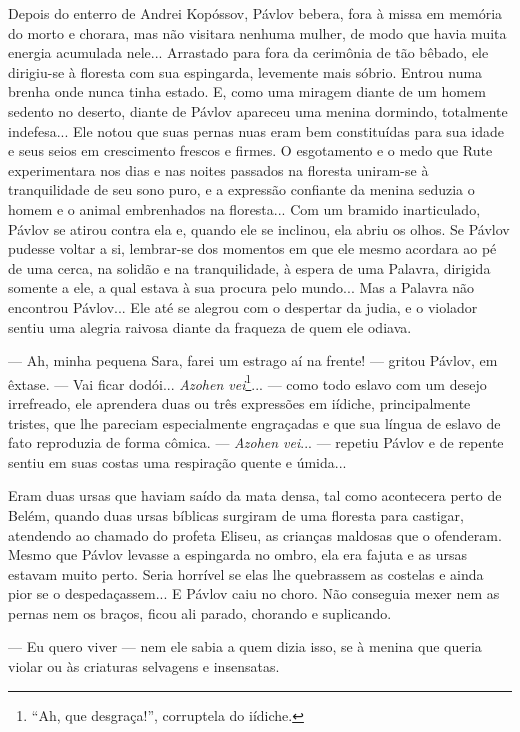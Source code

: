 Depois do enterro de Andrei Kopóssov, Pávlov bebera, fora à missa em
memória do morto e chorara, mas não visitara nenhuma mulher, de modo que
havia muita energia acumulada nele... Arrastado para fora da cerimônia
de tão bêbado, ele dirigiu-se à floresta com sua espingarda, levemente
mais sóbrio. Entrou numa brenha onde nunca tinha estado. E, como uma
miragem diante de um homem sedento no deserto, diante de Pávlov apareceu
uma menina dormindo, totalmente indefesa... Ele notou que suas pernas
nuas eram bem constituídas para sua idade e seus seios em crescimento
frescos e firmes. O esgotamento e o medo que Rute experimentara nos dias
e nas noites passados na floresta uniram-se à tranquilidade de seu sono
puro, e a expressão confiante da menina seduzia o homem e o animal
embrenhados na floresta... Com um bramido inarticulado, Pávlov se atirou
contra ela e, quando ele se inclinou, ela abriu os olhos. Se Pávlov
pudesse voltar a si, lembrar-se dos momentos em que ele mesmo acordara
ao pé de uma cerca, na solidão e na tranquilidade, à espera de uma
Palavra, dirigida somente a ele, a qual estava à sua procura pelo
mundo... Mas a Palavra não encontrou Pávlov... Ele até se alegrou com o
despertar da judia, e o violador sentiu uma alegria raivosa diante da
fraqueza de quem ele odiava.

--- Ah, minha pequena Sara, farei um estrago aí na frente! --- gritou
Pávlov, em êxtase. --- Vai ficar dodói... \emph{Azohen vei}\footnote{``Ah,
  que desgraça!'', corruptela do iídiche.}... --- como todo eslavo com
um desejo irrefreado, ele aprendera duas ou três expressões em iídiche,
principalmente tristes, que lhe pareciam especialmente engraçadas e que
sua língua de eslavo de fato reproduzia de forma cômica. ---
\emph{Azohen vei}... --- repetiu Pávlov e de repente sentiu em suas
costas uma respiração quente e úmida...

Eram duas ursas que haviam saído da mata densa, tal como acontecera
perto de Belém, quando duas ursas bíblicas surgiram de uma floresta para
castigar, atendendo ao chamado do profeta Eliseu, as crianças maldosas
que o ofenderam. Mesmo que Pávlov levasse a espingarda no ombro, ela era
fajuta e as ursas estavam muito perto. Seria horrível se elas lhe
quebrassem as costelas e ainda pior se o despedaçassem... E Pávlov caiu
no choro. Não conseguia mexer nem as pernas nem os braços, ficou ali
parado, chorando e suplicando.

--- Eu quero viver --- nem ele sabia a quem dizia isso, se à menina que
queria violar ou às criaturas selvagens e insensatas.

